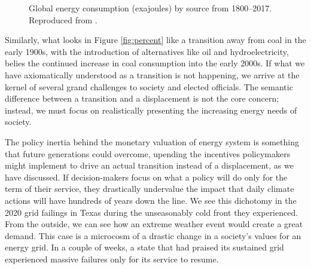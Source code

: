 \begin{figure}[H]
  \hfill
  \caption{
    Global energy consumption (exajoules) by source from 1800--2017. Reproduced
    from \cite{york_energy_2019}.}
  \label{fig:percent_total_energy}
\end{figure}

Similarly, what looks in Figure \ref{fig:percent} like a transition away from
coal in the early 1900s, with the introduction of alternatives like oil and
hydroelectricity, belies the continued increase in coal consumption into the
early 2000s. If what we have axiomatically understood as a transition is not
happening, we arrive at the kernel of several grand challenges to society
and elected officials. The semantic difference between a transition and a
displacement is not the core concern; instead, we must focus on realistically
presenting the increasing energy needs of society.

The policy inertia behind the monetary valuation of energy system is
something that future generations could overcome, upending the incentives
policymakers might implement to drive an actual transition instead of a
displacement, as we have discussed. If decision-makers focus on what a policy
will do only for the term of their service, they drastically undervalue the
impact that daily climate actions will have hundreds of years down the line. We
see this dichotomy in the 2020 grid failings in Texas during the unseasonably
cold front they experienced. From the outside, we can see how an extreme
weather event would create a great demand. This case is a microcosm of a drastic change in a society's values for an energy grid. In a
couple of weeks, a state that had praised its sustained grid
\cite{texas_ercot_nodate} experienced massive failures only for its
service to resume.

